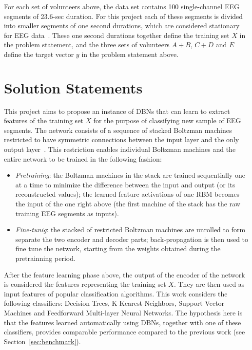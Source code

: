 \documentclass[12pt]{article}
\begin{document}
For each set of volunteers above, the data set contains 100 single-channel EEG segments of 23.6-sec duration. For this project each of these segments is divided into smaller segments of one second durations, which are considered stationary for EEG data~\cite{nigam2004neural}. These one second durations together define the training set $X$ in the problem statement, and the three sets of volunteers $A + B$, $C + D$ and $E$ define the target vector $y$ in the problem statement above.

\section{Solution Statements}
\label{sec:solution}

This project aims to propose an instance of DBNs that can learn to extract features of the training set $X$ for the purpose of classifying new sample of EEG segments. The network consists of a sequence of stacked Boltzman machines restricted to have symmetric connections between the input layer and the only output layer~\cite{hinton2006training}. This restriction enables individual Boltzman machines and the entire network to be trained in the following fashion:
\begin{itemize}
\item \textit{Pretraining}: the Boltzman machines in the stack are trained sequentially one at a time to minimize the difference between the input and output (or its reconstructed values); the learned feature activations of one RBM becomes the input of the one right above (the first machine of the stack has the raw training EEG segments as inputs).
\item \textit{Fine-tunig}: the stacked of restricted Boltzman machines are unrolled to form separate the two encoder and decoder parts; back-propagation is then used to fine tune the network, starting from the weights obtained during the pretrainning period.
\end{itemize}

After the feature learning phase above, the output of the encoder of the network is considered the features representing the training set $X$. They are then used as input features of popular classification algorithms. This work considers the following classifiers: Decision Trees, K-Kearest Neighbors, Support Vector Machines and Feedforward Multi-layer Neural Networks. The hypothesis here is that the features learned automatically using DBNs, together with one of these classifiers, provides comparable performance compared to the previous work (see Section~\ref{sec:benchmark}).
\end{document}
